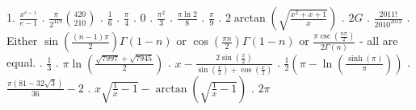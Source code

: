 1. $\frac{x^{e-1}}{e-1}$ \newline {}. $\frac{\pi}{2^{419}}\binom{420}{210}$ \newline {}. $\frac{1}{6}$ \newline {}. $\frac{\pi}{4}$ \newline {}. 0 \newline {}. $\frac{\pi^2}{3}$ \newline {}. $\frac{\pi \ln{2}}{8}$ \newline {}. $\frac{\pi}{9}$ \newline {}. $2\arctan\left(\sqrt{\frac{x^2+x+1}{x}}\right)$ \newline {}. $2G$ \newline {}. $\frac{2011!}{2010^{2012}}$ \newline {}. Either $\sin\left(\frac{(n-1)\pi}{2}\right)\Gamma(1-n)$ or $\cos\left(\frac{\pi n}{2}\right)\Gamma(1-n)$ or $\frac{\pi \csc\left(\frac{n\pi}{2}\right)}{2\Gamma(n)}$ - all are equal. \newline {}. $\frac{1}{3}$ \newline {}. $\pi\ln\left(\frac{\sqrt{7997}+\sqrt{7945}}{2}\right)$ \newline {}. $x-\frac{2\sin\left(\frac{x}{2}\right)}{\sin\left(\frac{x}{2}\right)+\cos\left(\frac{x}{2}\right)}$ \newline {}. $\frac{1}{2}\left(\pi-\ln\left(\frac{\sinh(\pi)}{\pi}\right)\right)$ \newline {}. $\frac{\pi(81-32\sqrt{3})}{36}-2$ \newline {}. $x\sqrt{\frac{1}{x}-1}-\arctan{\left(\sqrt{\frac{1}{x}-1}\right)}$ \newline {}. $2\pi$ \newline \newline
